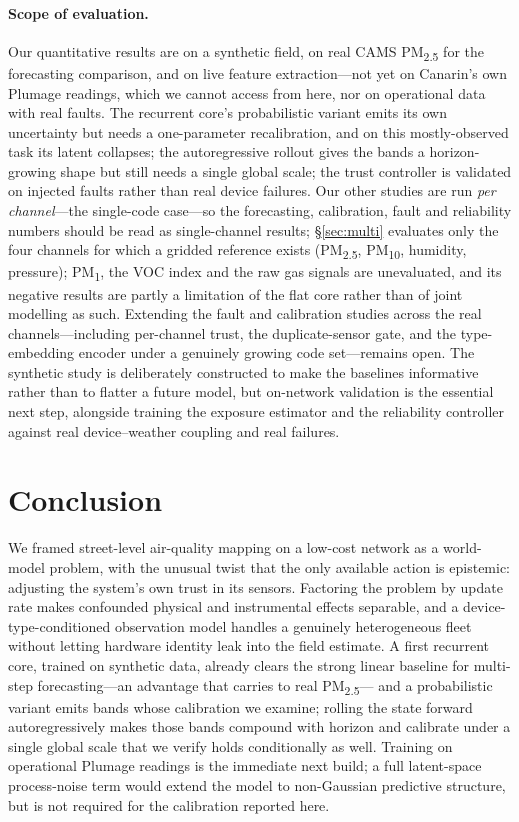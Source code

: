 \documentclass[10pt]{article}
\begin{document}
\paragraph{Scope of evaluation.}
Our quantitative results are on a synthetic field, on real CAMS PM\textsubscript{2.5}
for the forecasting comparison, and on live feature extraction---not yet on
Canarin's own Plumage readings, which we cannot access from here, nor on operational
data with real faults. The recurrent core's probabilistic variant emits its own
uncertainty but needs a one-parameter recalibration, and on this mostly-observed
task its latent collapses; the autoregressive rollout gives the bands a
horizon-growing shape but still needs a single global scale; the trust controller is
validated on injected faults rather than real device failures. Our other studies are
run \emph{per channel}---the single-code case---so the
forecasting, calibration, fault and reliability numbers should be read as
single-channel results; \S\ref{sec:multi} evaluates only the four channels for which a gridded reference
exists (PM\textsubscript{2.5}, PM\textsubscript{10}, humidity, pressure); PM\textsubscript{1},
the VOC index and the raw gas signals are unevaluated, and its negative results are
partly a limitation of the flat core rather than of joint modelling as such. Extending the fault and calibration studies across the
real channels---including per-channel trust, the duplicate-sensor gate, and the
type-embedding encoder under a genuinely growing code set---remains open. The
synthetic study
is deliberately constructed to make
the baselines informative rather than to flatter a future model, but on-network
validation is the essential next step, alongside training the exposure estimator
and the reliability controller against real device--weather coupling and real
failures.

\section{Conclusion}
We framed street-level air-quality mapping on a low-cost network as a world-model
problem, with the unusual twist that the only available action is epistemic:
adjusting the system's own trust in its sensors. Factoring the problem by update
rate makes confounded physical and instrumental effects separable, and a
device-type-conditioned observation model handles a genuinely heterogeneous fleet
without letting hardware identity leak into the field estimate. A first recurrent
core, trained on synthetic data, already clears the strong linear baseline for
multi-step forecasting---an advantage that carries to real PM\textsubscript{2.5}---
and a probabilistic variant emits bands whose calibration we examine; rolling the
state forward autoregressively makes those bands compound with horizon and
calibrate under a single global scale that we verify holds conditionally as well.
Training on operational Plumage readings is the immediate next build; a full
latent-space process-noise term would extend the model to non-Gaussian predictive
structure, but is not required for the calibration reported here.
\end{document}
